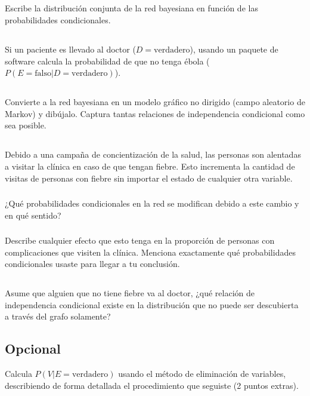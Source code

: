 \documentclass[12pt]{article}
\begin{document}
\subsection{} Escribe la distribución conjunta de la red bayesiana en función de las probabilidades condicionales.
\subsection{} Si un paciente es llevado al doctor ($D=\text{verdadero}$), usando un paquete de software calcula la probabilidad de que no tenga ébola  ($P(E=\text{falso}|D=\text{verdadero})$).
\subsection{} Convierte a la red bayesiana en un modelo gráfico no dirigido (campo aleatorio de Markov) y dibújalo. Captura tantas relaciones de independencia condicional como sea posible.
\subsection{} Debido a una campaña de concientización de la salud, las personas son alentadas a visitar la clínica en caso de que tengan fiebre. Esto incrementa la cantidad de visitas de personas con fiebre sin importar el estado de cualquier otra variable.
\subsubsection{} ¿Qué probabilidades condicionales en la red se modifican debido a este cambio y en qué sentido?
\subsubsection{} Describe cualquier efecto que esto tenga en la proporción de personas con complicaciones que visiten la clínica. Menciona exactamente qué probabilidades condicionales usaste para llegar a tu conclusión.
\subsection{} Asume que alguien que no tiene fiebre va al doctor, ¿qué relación de independencia condicional existe en la distribución que no puede ser descubierta a través del grafo solamente?
 \subsection{Opcional} Calcula $P(V|E=\text{verdadero})$ usando el método de eliminación de variables, describiendo de forma detallada el procedimiento que seguiste (2 puntos extras).
\end{document}
